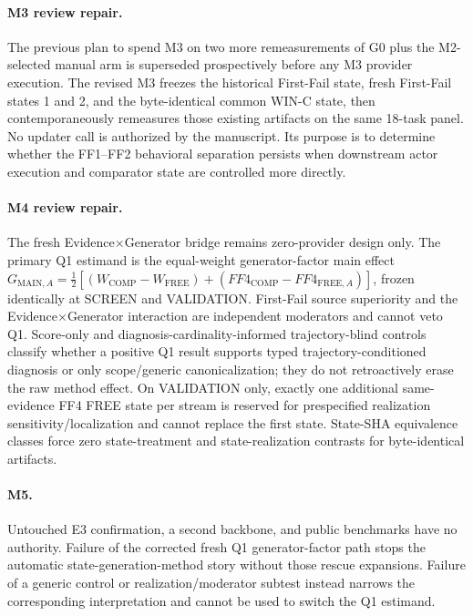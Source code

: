 \paragraph{M3 review repair.}
The previous plan to spend M3 on two more remeasurements of G0 plus the M2-selected manual arm is superseded prospectively before any M3 provider execution. The revised M3 freezes the historical First-Fail state, fresh First-Fail states 1 and 2, and the byte-identical common WIN-C state, then contemporaneously remeasures those existing artifacts on the same 18-task panel. No updater call is authorized by the manuscript. Its purpose is to determine whether the FF1--FF2 behavioral separation persists when downstream actor execution and comparator state are controlled more directly.

\paragraph{M4 review repair.}
The fresh Evidence$\times$Generator bridge remains zero-provider design only. The primary Q1 estimand is the equal-weight generator-factor main effect $G_{\mathrm{MAIN},A}=\frac12[(W_{\mathrm{COMP}}-W_{\mathrm{FREE}})+(FF4_{\mathrm{COMP}}-FF4_{\mathrm{FREE},A})]$, frozen identically at SCREEN and VALIDATION. First-Fail source superiority and the Evidence$\times$Generator interaction are independent moderators and cannot veto Q1. Score-only and diagnosis-cardinality-informed trajectory-blind controls classify whether a positive Q1 result supports typed trajectory-conditioned diagnosis or only scope/generic canonicalization; they do not retroactively erase the raw method effect. On VALIDATION only, exactly one additional same-evidence FF4 FREE state per stream is reserved for prespecified realization sensitivity/localization and cannot replace the first state. State-SHA equivalence classes force zero state-treatment and state-realization contrasts for byte-identical artifacts.

\paragraph{M5.}
Untouched E3 confirmation, a second backbone, and public benchmarks have no authority. Failure of the corrected fresh Q1 generator-factor path stops the automatic state-generation-method story without those rescue expansions. Failure of a generic control or realization/moderator subtest instead narrows the corresponding interpretation and cannot be used to switch the Q1 estimand.

